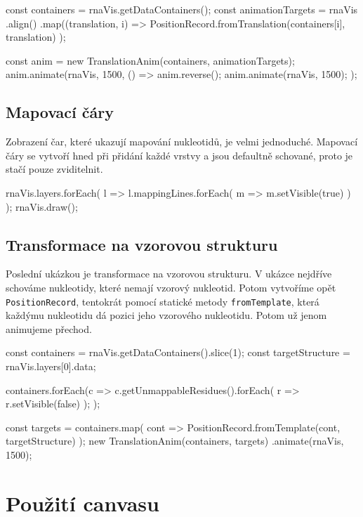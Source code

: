 \begin{code}
const containers = rnaVis.getDataContainers();
const animationTargets = rnaVis
  .align()
  .map((translation, i) 
    => PositionRecord.fromTranslation(containers[i], translation)
  );

const anim = new TranslationAnim(containers, animationTargets);
anim.animate(rnaVis, 1500, () => {
  anim.reverse();
  anim.animate(rnaVis, 1500);
});
\end{code}

\subsection{Mapovací čáry}

Zobrazení čar, které ukazují mapování nukleotidů, je velmi jednoduché.
Mapovací čáry se vytvoří hned při přidání každé vrstvy a jsou defaultně
schované, proto je stačí pouze zviditelnit.

\begin{code}
rnaVis.layers.forEach(
  l => l.mappingLines.forEach(
    m => m.setVisible(true)
  )
);
rnaVis.draw();
\end{code}

\subsection{Transformace na vzorovou strukturu}

Poslední ukázkou je transformace na vzorovou strukturu. V ukázce nejdříve
schováme nukleotidy, které nemají vzorový nukleotid. Potom vytvoříme opět
\texttt{PositionRecord}, tentokrát pomocí statické metody
\texttt{fromTemplate}, která každýmu nukleotidu dá pozici jeho vzorového
nukleotidu. Potom už jenom animujeme přechod.

\begin{code}
const containers = rnaVis.getDataContainers().slice(1);
const targetStructure = rnaVis.layers[0].data;

containers.forEach(c => {
  c.getUnmappableResidues().forEach(
    r => r.setVisible(false)
  );
});

const targets = containers.map(
  cont => PositionRecord.fromTemplate(cont, targetStructure)
);
new TranslationAnim(containers, targets)
  .animate(rnaVis, 1500);
\end{code}

\section{Použití canvasu}

